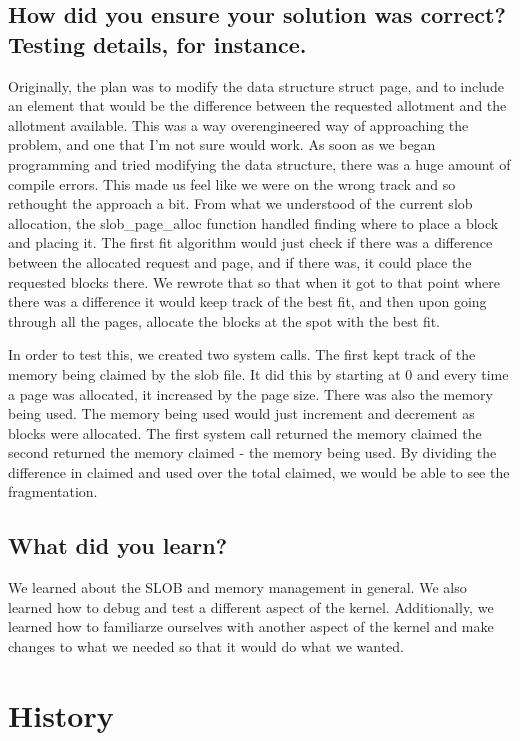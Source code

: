 \documentclass[letterpaper,10pt,titlepage]{article}
\begin{document}
\subsection{How did you ensure your solution was correct? Testing details, for instance.}

\sloppy Originally, the plan was to modify the data structure struct page, and to include an element that would be the difference between the requested allotment and the allotment available. 
This was a way overengineered way of approaching the problem, and one that I’m not sure would work. 
As soon as we began programming and tried modifying the data structure, there was a huge amount of compile errors. 
This made us feel like we were on the wrong track and so rethought the approach a bit. 
From what we understood of the current slob allocation, the slob\_page\_alloc function handled finding where to place a block and placing it. 
The first fit algorithm would just check if there was a difference between the allocated request and page, and if there was, it could place the requested blocks there. 
We rewrote that so that when it got to that point where there was a difference it would keep track of the best fit, and then upon going through all the pages, allocate the blocks at the spot with the best fit. 
	
In order to test this, we created two system calls. 
The first kept track of the memory being claimed by the slob file. 
It did this by starting at 0 and every time a page was allocated, it increased by the page size. 
There was also the memory being used. 
The memory being used would just increment and decrement as blocks were allocated. 
The first system call returned the memory claimed the second returned the memory claimed - the memory being used. 
By dividing the difference in claimed and used over the total claimed, we would be able to see the fragmentation. 

\sloppy  

\subsection{What did you learn?}

\sloppy  We learned about the SLOB and memory management in general.
We also learned how to debug and test a different aspect of the kernel.
Additionally, we learned how to familiarze ourselves with another aspect of the kernel and make changes to what we needed so that it would do what we wanted.


\section {History}
\end{document}
